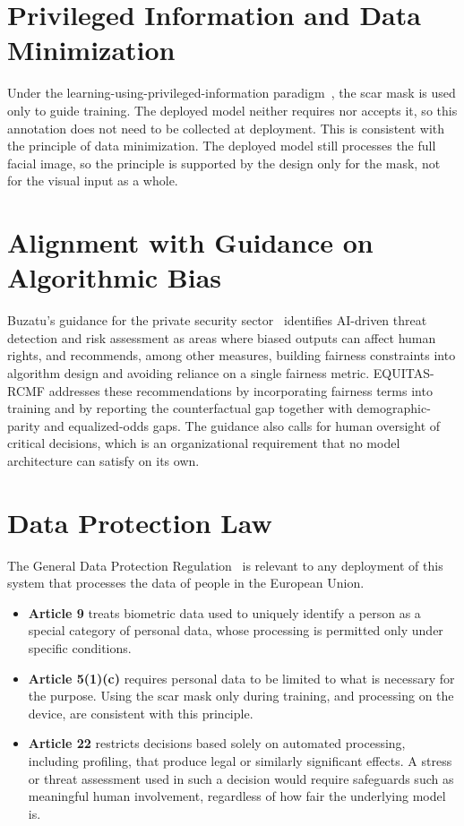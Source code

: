 \section{Privileged Information and Data Minimization}
Under the learning-using-privileged-information paradigm~\cite{vapnik2009, vapnik2015}, the scar mask is used only to guide training. The deployed model neither requires nor accepts it, so this annotation does not need to be collected at deployment. This is consistent with the principle of data minimization. The deployed model still processes the full facial image, so the principle is supported by the design only for the mask, not for the visual input as a whole.

\section{Alignment with Guidance on Algorithmic Bias}
Buzatu's guidance for the private security sector~\cite{buzatu2024} identifies AI-driven threat detection and risk assessment as areas where biased outputs can affect human rights, and recommends, among other measures, building fairness constraints into algorithm design and avoiding reliance on a single fairness metric. EQUITAS-RCMF addresses these recommendations by incorporating fairness terms into training and by reporting the counterfactual gap together with demographic-parity and equalized-odds gaps. The guidance also calls for human oversight of critical decisions, which is an organizational requirement that no model architecture can satisfy on its own.

\section{Data Protection Law}
The General Data Protection Regulation~\cite{gdpr2016} is relevant to any deployment of this system that processes the data of people in the European Union.
\begin{itemize}
    \item \textbf{Article 9} treats biometric data used to uniquely identify a person as a special category of personal data, whose processing is permitted only under specific conditions.
    \item \textbf{Article 5(1)(c)} requires personal data to be limited to what is necessary for the purpose. Using the scar mask only during training, and processing on the device, are consistent with this principle.
    \item \textbf{Article 22} restricts decisions based solely on automated processing, including profiling, that produce legal or similarly significant effects. A stress or threat assessment used in such a decision would require safeguards such as meaningful human involvement, regardless of how fair the underlying model is.
\end{itemize}

